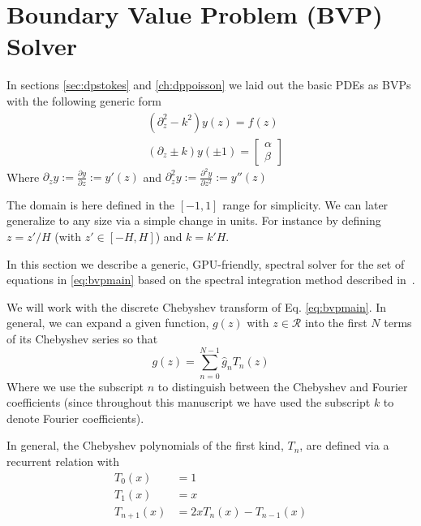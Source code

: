 \documentclass[ twoside,openright,titlepage,numbers=noenddot,%
headinclude,footinclude,cleardoublepage=empty,abstract=on,
BCOR=5mm,paper=b5,fontsize=11pt, dvipsnames
]{scrreprt}
\newcommand{\gpu}{\gls{GPU}\xspace}
\newcommand{\fou}[1]{\widehat{#1}}
\begin{document}
\chapter{Boundary Value Problem (BVP) Solver} \label{sec:bvp}
In sections \ref{sec:dpstokes} and \ref{ch:dppoisson} we laid out the basic \glspl{PDE} as \glspl{BVP} with the following generic form
\begin{equation}
  \label{eq:bvpmain}
  \begin{aligned}
    &(\partial^2_{z}-k^2)y(z)=f(z)\\
    &(\partial_{z}\pm k)y(\pm 1)=
    \begin{bmatrix}
      \alpha\\
      \beta
    \end{bmatrix}
\end{aligned}
\end{equation}
Where $\partial_z y:= \frac{\partial y}{\partial z} := y'(z)$ and $\partial^2_{z} y:= \frac{\partial^2 y}{\partial z^2} := y''(z)$

The domain is here defined in the $[-1, 1]$ range for simplicity. We can later generalize to any size via a simple change in units. For instance by defining $z = z'/H$ (with $z'\in [-H, H]$) and $k = k'H$.

In this section we describe a generic, \gpu-friendly, spectral solver for the set of equations in \eqref{eq:bvpmain} based on the spectral integration method described in~\cite{Greengard1991}.

We will work with the discrete Chebyshev transform of Eq. \eqref{eq:bvpmain}. In general, we can expand a given function, $g(z)$ with $z\in \mathcal{R}$ into the first $N$ terms of its Chebyshev series so that
\begin{equation}
\label{eq:bvpchebexp}
g(z) = \sum_{n=0}^{N-1} \fou{g}_n T_n(z)
\end{equation}
Where we use the subscript $n$ to distinguish between the Chebyshev and Fourier coefficients (since throughout this manuscript we have used the subscript $k$ to denote Fourier coefficients).

In general, the Chebyshev polynomials of the first kind, $T_n$, are defined via a recurrent relation with
\begin{equation}
  \label{eq:bvpchebpoly}
  \begin{aligned}
    T_0(x) &= 1\\
    T_1(x) &= x\\
    T_{n+1}(x) &= 2xT_n(x) - T_{n-1}(x)
  \end{aligned}
\end{equation}
\end{document}

